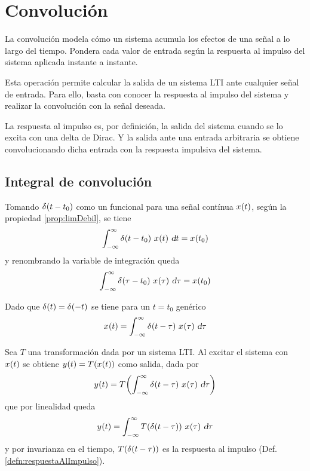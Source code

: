 \chapter{Convolución}
\label{chapter:convolucion}

La convolución modela cómo un sistema acumula los efectos de una señal a lo largo del tiempo.
Pondera cada valor de entrada según la respuesta al impulso del sistema aplicada instante a instante.

Esta operación permite calcular la salida de un sistema LTI ante cualquier señal de entrada.
Para ello, basta con conocer la respuesta al impulso del sistema y realizar la convolución con la señal deseada.

La respuesta al impulso es, por definición, la salida del sistema cuando se lo excita con una delta de Dirac.
Y la salida ante una entrada arbitraria se obtiene convolucionando dicha entrada con la respuesta impulsiva del sistema.

\begin{center}
    \def\svgwidth{0.6\linewidth}
    
\end{center}

\section{Integral de convolución}

Tomando $\fx[\delta]{t-t_0}$ como un funcional para una señal contínua $\fx[x]{t}$, según la propiedad \ref{prop:limDebil}, se tiene
\[
    \int_{-\infty}^\infty \fx[\delta]{t-t_0} \, \fx[x]{t} \, \dif t = \fx[x]{t_0}
\]
y renombrando la variable de integración queda
\[
    \int_{-\infty}^\infty \fx[\delta]{\tau-t_0} \, \fx[x]{\tau} \, \dif \tau = \fx[x]{t_0}
\]

Dado que $\fx[\delta]{t} = \fx[\delta]{-t}$ se tiene para un $t=t_0$ genérico
\[
    \fx[x]{t} = \int_{-\infty}^\infty \fx[\delta]{t-\tau} \, \fx[x]{\tau} \, \dif \tau
\]

Sea $T$ una transformación dada por un sistema LTI.
Al excitar el sistema con $\fx[x]{t}$ se obtiene $\fx[y]{t} = \fx[T]{\fx[x]{t}}$ como salida, dada por
\[
    \fx[y]{t} = \fx[T]{ \int_{-\infty}^\infty \fx[\delta]{t-\tau} \, \fx[x]{\tau} \, \dif \tau }
\]
que por linealidad queda
\[
    \fx[y]{t} = \int_{-\infty}^\infty \fx[T]{\fx[\delta]{t-\tau}} \, \fx[x]{\tau} \, \dif \tau
\]
y por invarianza en el tiempo, $\fx[T]{\fx[\delta]{t-\tau}}$ es la respuesta al impulso (Def. \ref{defn:respuestaAlImpulso}).

